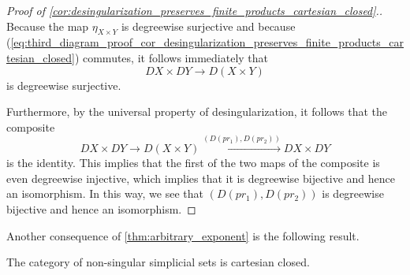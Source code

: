 \begin{proof}[Proof of \cref{cor:desingularization_preserves_finite_products_cartesian_closed}.]
Because the map $\eta _{X\times Y}$ is degreewise surjective and because (\ref{eq:third_diagram_proof_cor_desingularization_preserves_finite_products_cartesian_closed}) commutes, it follows immediately that
\[DX\times DY\to D(X\times Y)\]
is degreewise surjective.

Furthermore, by the universal property of desingularization, it follows that the composite
\[DX\times DY\to D(X\times Y)\xrightarrow{(D(pr_1),D(pr_2))} DX\times DY\]
is the identity. This implies that the first of the two maps of the composite is even degreewise injective, which implies that it is degreewise bijective and hence an isomorphism. In this way, we see that $(D(pr_1),D(pr_2))$ is degreewise bijective and hence an isomorphism.
\end{proof}
\noindent Another consequence of \cref{thm:arbitrary_exponent} is the following result.
\begin{corollary}
The category of non-singular simplicial sets is cartesian closed.
\end{corollary}








